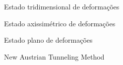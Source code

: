 \item[3D] 		Estado tridimensional de deformações
\item[AXI] 		Estado axissimétrico de deformações
\item[EPD] 		Estado plano de deformações
\item[NATM] 	New Austrian Tunneling Method

